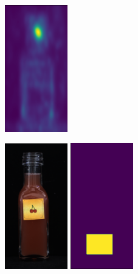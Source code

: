 \begin{figure}[H]
\begin{subfigure}[b]{\textwidth}
\begin{minipage}{0.45\textwidth}
            \includegraphics[width=0.3\textwidth]{figures/appendix/appendix_RevDist/JB/007_m.png}
        \end{minipage}
        \begin{minipage}{0.45\textwidth}
            \centering
            \includegraphics[width=0.3\textwidth]{figures/appendix/appendix_RevDist/JB/013.png}
            \includegraphics[width=0.3\textwidth]{figures/appendix/appendix_RevDist/JB/013_mask.png}

\end{minipage}
\end{subfigure}
\end{figure}
